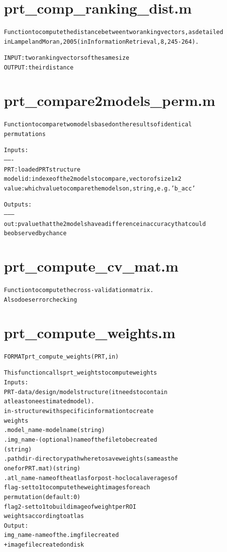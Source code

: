 \section{prt\_comp\_ranking\_dist.m}
\begin{alltt}

 Function to compute the distance between two ranking vectors, as detailed
 in Lampel and Moran, 2005 (in Information Retrieval, 8, 245-264).
 
 INPUT : two ranking vectors of the same size
 OUTPUT: their distance
\end{alltt}


\section{prt\_compare2models\_perm.m}
\begin{alltt}

 Function to compare two models based on the results of identical
 permutations
 
 Inputs:
 -------
 PRT    : loaded PRT structure
 modelid: indexe of the 2 models to compare, vector of size 1x2
 value  : which value to compare the models on, string, e.g. 'b\_acc'
 
 Outputs:
 --------
 out: p value that the 2 models have a difference in accuracy that could
 be observed by chance
\end{alltt}


\section{prt\_compute\_cv\_mat.m}
\begin{alltt}

 Function to compute the cross-validation matrix.
 Also does error checking
\end{alltt}


\section{prt\_compute\_weights.m}
\begin{alltt}

 FORMAT prt\_compute\_weights(PRT,in)
 
 This function calls prt\_weights to compute weights
 Inputs:
       PRT             - data/design/model structure (it needs to contain
                         at least one estimated model).
       in              - structure with specific information to create
                         weights
           .model\_name - model name (string)
           .img\_name   - (optional) name of the file to be created
                         (string)
           .pathdir    - directory path where to save weights (same as the
                         one for PRT.mat) (string)
           .atl\_name   - name of the atlas for post-hoc local averages of
       flag            - set to 1 to compute the weight images for each
                         permutation (default: 0)
       flag2           - set to 1 to build image of weight per ROI
                         weights according to atlas
 Output:
       img\_name        - name of the .img file created
       + image file created on disk
\end{alltt}


